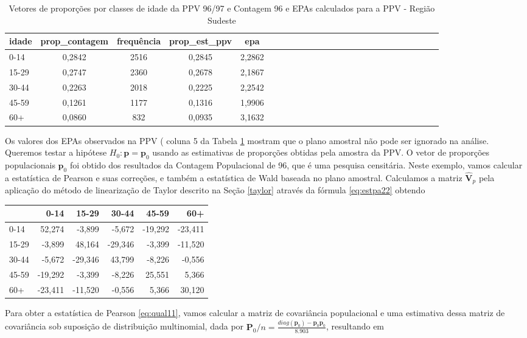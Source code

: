 \documentclass[]{book}
\theoremstyle{definition}
\theoremstyle{definition}
\theoremstyle{definition}
\theoremstyle{remark}
\begin{document}
\begin{table}

\caption{\label{tab:ppcount}Vetores de proporções por classes de idade da PPV 96/97 e Contagem
 96 e EPAs calculados para a PPV - Região Sudeste}
\centering
\begin{tabular}[t]{lcccclcccclcccclcccclcccc}
\toprule
idade & prop\_contagem & frequência & prop\_est\_ppv & epa\\
\midrule
0-14 & 0,2842 & 2516 & 0,2845 & 2,2862\\
15-29 & 0,2747 & 2360 & 0,2678 & 2,1867\\
30-44 & 0,2263 & 2018 & 0,2225 & 2,2542\\
45-59 & 0,1261 & 1177 & 0,1316 & 1,9906\\
60+ & 0,0860 & 832 & 0,0935 & 3,1632\\
\bottomrule
\end{tabular}
\end{table}

Os valores dos EPAs observados na PPV ( coluna 5 da Tabela
\ref{tab:ppcount} mostram que o plano amostral não pode ser ignorado na
análise. Queremos testar a hipótese \(H_{0}:\mathbf{p=p}_{0}\) usando as
estimativas de proporções obtidas pela amostra da PPV. O vetor de
proporções populacionais \(\mathbf{p}_{0}\) foi obtido dos resultados da
Contagem Populacional de 96, que é uma pesquisa censitária. Neste
exemplo, vamos calcular a estatística de Pearson e suas correções, e
também a estatística de Wald baseada no plano amostral. Calculamos a
matriz \(\widehat{\mathbf{V}}_{p}\) pela aplicação do método de
linearização de Taylor descrito na Seção \ref{taylor} através da fórmula
\eqref{eq:estpa22} obtendo

\begin{tabular}{l|r|r|r|r|r}
\hline
  & 0-14 & 15-29 & 30-44 & 45-59 & 60+\\
\hline
0-14 & 52,274 & -3,899 & -5,672 & -19,292 & -23,411\\
\hline
15-29 & -3,899 & 48,164 & -29,346 & -3,399 & -11,520\\
\hline
30-44 & -5,672 & -29,346 & 43,799 & -8,226 & -0,556\\
\hline
45-59 & -19,292 & -3,399 & -8,226 & 25,551 & 5,366\\
\hline
60+ & -23,411 & -11,520 & -0,556 & 5,366 & 30,120\\
\hline
\end{tabular}

Para obter a estatística de Pearson \eqref{eq:qual11}, vamos calcular a
matriz de covariância populacional e uma estimativa dessa matriz de
covariância sob suposição de distribuição multinomial, dada por
\(\mathbf{P}_{0}/n=\frac{diag\left( \mathbf{p}_{0}\right) -\mathbf{p}_{0}\mathbf{p}_{0}^{^{\prime }}}{8.903}\),
resultando em
\end{document}

